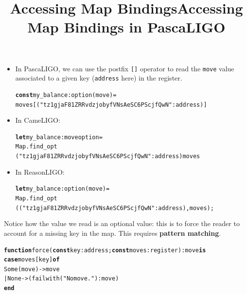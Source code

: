 \documentclass[wide]{slides}
\newcommand{\Kcase}[0]{\textbf{case}\xspace}
\newcommand{\Kconst}[0]{\textbf{const}\xspace}
\newcommand{\Kend}[0]{\textbf{end}\xspace}
\newcommand{\Kfunction}[0]{\textbf{function}\xspace}
\newcommand{\Kis}[0]{\textbf{is}\xspace}
\newcommand{\Kof}[0]{\textbf{of}\xspace}
\newcommand{\Klet}[0]{\textbf{let}\xspace}
\begin{document}
\begin{slide}
  \title{Accessing Map Bindings}

  \begin{itemize}

    \item In PascaLIGO, we can use the postfix \texttt{[]} operator to
      read the \texttt{move} value associated to a given key
      (\texttt{address} here) in the register.
      \begin{alltt}
\Kconst my_balance : option (move) =
  moves [("tz1gjaF81ZRRvdzjobyfVNsAeSC6PScjfQwN" : address)]
      \end{alltt}

    \item In CameLIGO:
      \begin{alltt}
\Klet my_balance : move option =
  Map.find_opt
    ("tz1gjaF81ZRRvdzjobyfVNsAeSC6PScjfQwN" : address) moves
      \end{alltt}

    \item In ReasonLIGO:
      \begin{alltt}
\Klet my_balance : option (move) =
  Map.find_opt
    (("tz1gjaF81ZRRvdzjobyfVNsAeSC6PScjfQwN" : address), moves);
      \end{alltt}

  \end{itemize}

\end{slide}

\begin{slide}
  \title{Accessing Map Bindings in PascaLIGO}

    Notice how the value we read is an optional value: this is to
    force the reader to account for a missing key in the map. This
    requires \textbf{pattern matching}.
      \begin{alltt}
\Kfunction force (\Kconst key: address; \Kconst moves: register) : move \Kis
  \Kcase moves[key] \Kof
    Some (move) -> move
  | None -> (failwith ("No move.") : move)
  \Kend
      \end{alltt}

\end{slide}
\end{document}
